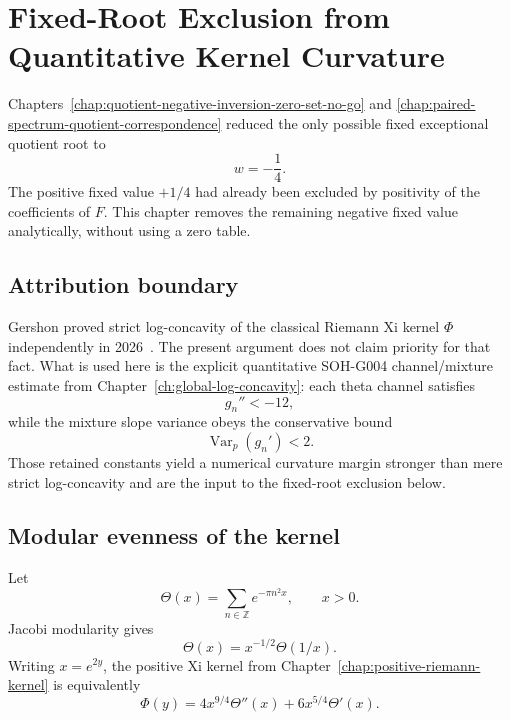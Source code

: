 \chapter{Fixed-Root Exclusion from Quantitative Kernel Curvature}
\label{chap:fixed-root-exclusion-kernel-curvature}


Chapters~\ref{chap:quotient-negative-inversion-zero-set-no-go} and
\ref{chap:paired-spectrum-quotient-correspondence} reduced the only possible
fixed exceptional quotient root to
\[
 w=-\frac14.
\]
The positive fixed value $+1/4$ had already been excluded by positivity of the
coefficients of $F$.  This chapter removes the remaining negative fixed value
analytically, without using a zero table.

\section{Attribution boundary}

Gershon proved strict log-concavity of the classical Riemann Xi kernel
$\Phi$ independently in 2026~\cite{gershon2026logconcavity}.  The present
argument does not claim priority for that fact.  What is used here is the
explicit quantitative SOH-G004 channel/mixture estimate from
Chapter~\ref{ch:global-log-concavity}: each theta channel satisfies
\[
 g_n''<-12,
\]
while the mixture slope variance obeys the conservative bound
\[
 \operatorname{Var}_p(g_n')<2.
\]
Those retained constants yield a numerical curvature margin stronger than
mere strict log-concavity and are the input to the fixed-root exclusion below.

\section{Modular evenness of the kernel}

Let
\[
 \Theta(x)=\sum_{n\in\mathbb Z}e^{-\pi n^2x},
 \qquad x>0.
\]
Jacobi modularity gives
\begin{equation}
 \Theta(x)=x^{-1/2}\Theta(1/x).
 \label{eq:g017-theta-modular}
\end{equation}
Writing $x=e^{2y}$, the positive Xi kernel from
Chapter~\ref{chap:positive-riemann-kernel} is equivalently
\begin{equation}
 \Phi(y)=4x^{9/4}\Theta''(x)+6x^{5/4}\Theta'(x).
 \label{eq:g017-kernel-theta}
\end{equation}

